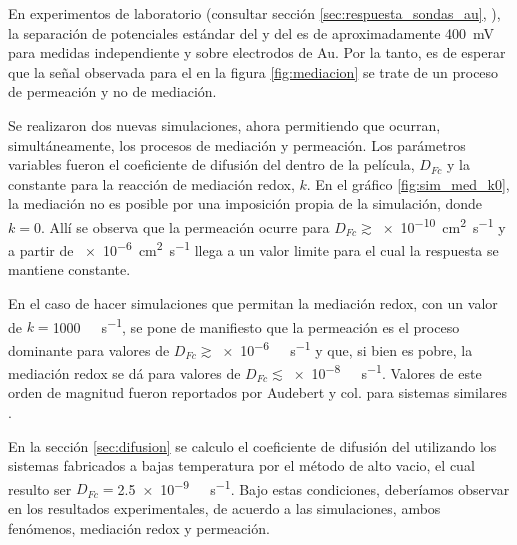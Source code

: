 		En experimentos de laboratorio (consultar sección \ref{sec:respuesta_sondas_au}, \pageref{sec:respuesta_sondas_au}), la separación de potenciales estándar del \ru\space y del \fc\space es de aproximadamente \SI{400}{\milli\volt} para medidas independiente y sobre electrodos de Au. Por la tanto, es de esperar que la señal observada para el \fc\space en la figura \ref{fig:mediacion} se trate de un proceso de permeación y no de mediación.

		Se realizaron dos nuevas simulaciones, ahora permitiendo que ocurran, simultáneamente, los procesos de mediación y permeación. Los parámetros variables fueron el coeficiente de difusión del \fc\space dentro de la película, $D_{Fc}$ y la constante para la reacción de mediación redox, $k$. En el gráfico \ref{fig:sim_med_k0}, la mediación no es posible por una imposición propia de la simulación, donde $k\!=\!0$. Allí se observa que la permeación ocurre para $D_{Fc}\!\!\gtrsim$\SI{e-10}{\square\cm\per\second} y a partir de \SI{e-6}{\square\cm\per\second} llega a un valor limite para el cual la respuesta se mantiene constante.

		En el caso de hacer simulaciones que permitan la mediación redox, con un valor de $k\!=$\SI{1000}{\per\Molar\per\second}, se pone de manifiesto que la permeación es el proceso dominante para valores de $D_{Fc}\!\gtrsim$\SI{e-6}{\per\Molar\per\second} y que, si bien es pobre, la mediación redox se dá para valores de $D_{Fc}\!\!\lesssim$\SI{e-8}{\per\Molar\per\second}. Valores de este orden de magnitud fueron reportados por Audebert y col. para sistemas similares\cite{Audebert2015} .

		En la sección \ref{sec:difusion} se calculo el coeficiente de difusión del \fc\space utilizando los sistemas fabricados a bajas temperatura por el método de alto vacio, el cual resulto ser $D_{Fc}\!\!=$\SI{2.5e-9}{\per\Molar\per\second}. Bajo estas condiciones, deberíamos observar en los resultados experimentales, de acuerdo a las simulaciones, ambos fenómenos, mediación redox y permeación. 
			
